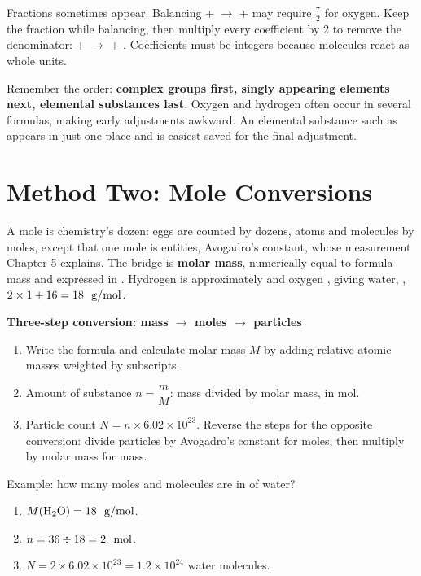 Fractions sometimes appear. Balancing  +  $\rightarrow$  +  may require $\frac{7}{2}$ for oxygen. Keep the fraction while balancing, then multiply every coefficient by 2 to remove the denominator:  +  $\rightarrow$  + . Coefficients must be integers because molecules react as whole units.

Remember the order: \textbf{complex groups first, singly appearing elements next, elemental substances last}. Oxygen and hydrogen often occur in several formulas, making early adjustments awkward. An elemental substance such as  appears in just one place and is easiest saved for the final adjustment.

\section{Method Two: Mole Conversions}

A mole is chemistry's dozen: eggs are counted by dozens, atoms and molecules by moles, except that one mole is  entities, Avogadro's constant, whose measurement Chapter 5 explains. The bridge is \textbf{molar mass}, numerically equal to formula mass and expressed in . Hydrogen is approximately  and oxygen , giving water, , $2\times1+16=18\ \ \mathrm{g/mol}$.

\textbf{Three-step conversion: mass $\rightarrow$ moles $\rightarrow$ particles}

\begin{enumerate}[itemsep=2pt]
\item Write the formula and calculate molar mass $M$ by adding relative atomic masses weighted by subscripts.
\item Amount of substance $n = \dfrac{m}{M}$: mass divided by molar mass, in mol.
\item Particle count $N = n\times 6.02\times 10^{23}$. Reverse the steps for the opposite conversion: divide particles by Avogadro's constant for moles, then multiply by molar mass for mass.
\end{enumerate}

Example: how many moles and molecules are in  of water?

\begin{enumerate}[itemsep=2pt]
\item $M(\chem{H_2O}) = 18\ \ud{}{g/mol}$.
\item $n = 36 \div 18 = 2\ \ud{}{mol}$.
\item $N = 2\times 6.02\times 10^{23} = 1.2\times 10^{24}$ water molecules.
\end{enumerate}

